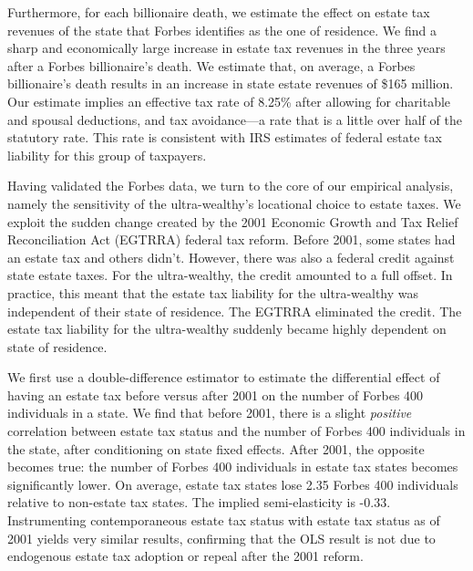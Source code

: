 \documentclass[12pt]{article}
\begin{document}
Furthermore, for each  billionaire death, we estimate the effect on  estate tax revenues of the state that Forbes identifies as the one of residence. We find a sharp and economically large increase in estate tax revenues in the three years after a Forbes billionaire's death. We estimate that, on average, a Forbes billionaire's death results in an increase in state estate revenues of \$165 million. 
Our estimate implies an effective tax rate of 8.25\% after allowing for charitable and spousal deductions, and tax avoidance---a rate that is a little over half of the statutory rate. This rate is consistent with IRS estimates of federal estate tax liability for this group of taxpayers. 


Having validated the Forbes data, we turn to the core of our empirical analysis, namely  the sensitivity of the ultra-wealthy's locational choice to estate taxes. 
We exploit the sudden change  created by the 2001 Economic Growth and Tax Relief Reconciliation Act (EGTRRA) federal tax reform. 
Before 2001, some states had an estate tax and others didn't. However, there was also a federal credit against state  estate taxes. For the ultra-wealthy, the credit amounted to a full offset. In practice, this meant that 
the estate tax liability for the ultra-wealthy was independent of their state of residence.
The EGTRRA eliminated the credit. The estate tax liability for the ultra-wealthy suddenly became highly dependent on  state of residence.

We first use a double-difference estimator to estimate the differential effect of having an estate tax before versus after 2001 on the number of Forbes 400 individuals in a state. 
We find that before 2001, there is a slight {\it positive} correlation between estate tax status and the number of Forbes 400 individuals in the state, after conditioning on state fixed effects. After 2001, the opposite becomes true: the number of Forbes 400 individuals in estate tax states becomes significantly lower. On average, estate tax states lose 2.35 Forbes 400 individuals relative to non-estate tax states. The implied semi-elasticity is -0.33. Instrumenting contemporaneous estate tax status with estate tax status as of 2001 yields very similar results, confirming that the OLS result is not due to endogenous estate tax adoption or repeal after the 2001 reform.    
\end{document}

